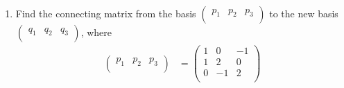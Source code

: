 \documentclass[../psets.tex]{subfiles}
\begin{document}
\begin{enumerate}
\begin{enumerate}
\begin{proof}
\begin{equation*}
\begin{pNiceArray}{ccc|c}
                    -1 & 2 & 1 & 1\\
                    3 & -1 & 2 & 0\\
                    2 & 1 & 3 & 1\\
                \end{pNiceArray}
                \cong
                \begin{pNiceArray}{ccc|c}
                    1 & 0 & 1 & \frac{1}{5}\\
                    0 & 1 & 1 & \frac{3}{5}\\
                    0 & 0 & 0 & 0
                \end{pNiceArray}
            \end{equation*}
            It follows that $A$  In particular, these are given by
            \begin{equation*}
                \boxed{
                    x =
                    \begin{pNiceMatrix}
                        \frac{1}{5}-x^3\\
                        \frac{3}{5}-x^3\\
                        x^3\\
                    \end{pNiceMatrix}
                }
            \end{equation*}
            for $x^3\in\R$.
        \end{proof}
    \end{enumerate}
    \item Find the connecting matrix from the basis $
        \begin{pmatrix}
            p_1 & p_2 & p_3\\
        \end{pmatrix}
    $ to the new basis $
        \begin{pmatrix}
            q_1 & q_2 & q_3\\
        \end{pmatrix}
    $, where
    \begin{align*}
        \begin{pmatrix}
            p_1 & p_2 & p_3\\
        \end{pmatrix}
        &=
        \begin{pmatrix}
            1 & 0 & -1\\
            1 & 2 & 0\\
            0 & -1 & 2\\

\end{pmatrix}
\end{align*}
\end{enumerate}
\end{document}
